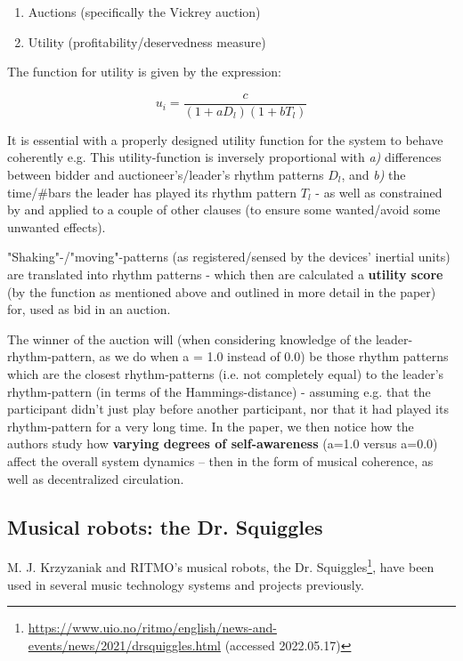 	\begin{enumerate}
		\item Auctions (specifically the Vickrey auction)
		\item Utility (profitability/deservedness measure)
	\end{enumerate}

	The function for utility is given by the expression:

	\begin{equation}
	u_i = \frac{c}{(1+a D_l)(1+b T_l)}
	\end{equation}
	\newline

	It is essential with a properly designed utility function for the system to behave coherently e.g. This utility-function is inversely proportional with \textit{a)} differences between bidder and auctioneer's/leader's rhythm patterns $D_l$, and \textit{b)} the time/\#bars the leader has played its rhythm pattern $T_l$ - as well as constrained by and applied to a couple of other clauses (to ensure some wanted/avoid some unwanted effects).

	"Shaking"-/"moving"-patterns (as registered/sensed by the devices' inertial units) are translated into rhythm patterns - which then are calculated a \textbf{utility score} (by the function as mentioned above and outlined in more detail in the paper) for, used as bid in an auction.

	The winner of the auction will (when considering knowledge of the leader-rhythm-pattern, as we do when a = 1.0 instead of 0.0) be those rhythm patterns which are the closest rhythm-patterns (i.e. not completely equal) to the leader's rhythm-pattern (in terms of the Hammings-distance) - assuming e.g. that the participant didn't just play before another participant, nor that it had played its rhythm-pattern for a very long time. In the paper, we then notice how the authors study how \textbf{varying degrees of self-awareness} (a=1.0 versus a=0.0) affect the overall system dynamics -- then in the form of musical coherence, as well as decentralized circulation.

	
	\subsection{Musical robots: the Dr. Squiggles}
	\label{dr_squiggles}
	
	M. J. Krzyzaniak and RITMO's musical robots, the Dr. Squiggles\footnote{\url{https://www.uio.no/ritmo/english/news-and-events/news/2021/drsquiggles.html} (accessed 2022.05.17)}, have been used in several music technology systems and projects previously.
	
